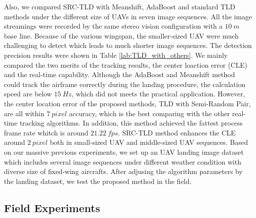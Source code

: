 Also, we compared SRC-TLD with Meanshift, AdaBoost and standard TLD methods under the different size of UAVs in seven image sequences. All the image streamings were recorded by the same stereo vision configuration with a $10\ m$ base line. Because of the various wingspan, the smaller-sized UAV were much challenging to detect which leads to much shorter image sequences. The detection precision results were shown in Table \ref{lab:TLD_with_others}. We mainly compared the two merits of the tracking results, the center loaction error (CLE) and the real-time capability. Although the AdaBoost and Meanshift method could track the airframe correctly during the landing procedure, the calculation speed are below $15\ Hz$, which did not meets the practical application. However, the center location error of the proposed methods, TLD with Semi-Random Pair, are all within $7\ pixel$ accuracy, which is the best comparing with the other real-time tracking algorithms. In addition, this method achieved the fattest process frame rate whitch is around $21.22 \ fps$. SRC-TLD method enhances the CLE around $2\ pixel$ both in small-sized UAV and middle-sized UAV sequences. Based on our massive previous experiments, we set up an UAV landing image dataset which includes several image sequences under different weather condition with diverse size of fixed-wing aircrafts. After adjusing the algorithm parameters by the landing dataset, we test the proposed method in the field. 




\subsection{Field Experiments}
